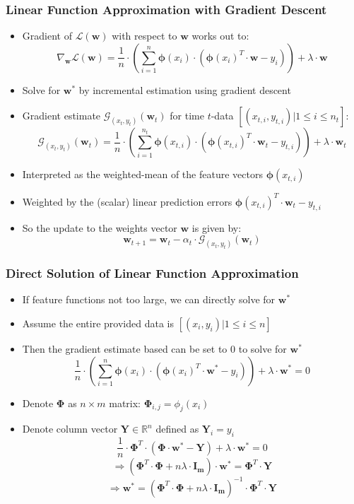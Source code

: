 \documentclass[handout]{beamer}
\begin{document}
\begin{frame}
\frametitle{Linear Function Approximation with Gradient Descent}
\pause
\begin{itemize}[<+->]
\item Gradient of $\mathcal{L}(\bm{w})$ with respect to $\bm{w}$ works out to:
$$\nabla_{\bm{w}} \mathcal{L}(\bm{w}) = \frac 1 n \cdot (\sum_{i=1}^n \bm{\phi}(x_i) \cdot (\bm{\phi}(x_i)^T \cdot \bm{w} - y_i)) + \lambda \cdot \bm{w}$$
\item Solve for $\bm{w^*}$ by incremental estimation using gradient descent
\item Gradient estimate $\mathcal{G}_{(x_t,y_t)}(\bm{w}_t)$ for time $t$-data $[(x_{t,i}, y_{t,i})|1 \leq i \leq n_t]$:
$$\mathcal{G}_{(x_t, y_t)}(\bm{w}_t) = \frac 1 n \cdot (\sum_{i=1}^{n_t} \bm{\phi}(x_{t,i}) \cdot (\bm{\phi}(x_{t,i})^T \cdot \bm{w}_t - y_{t,i})) + \lambda \cdot \bm{w}_t$$
\item Interpreted as the weighted-mean of the feature vectors $\bm{\phi}(x_{t,i})$
\item Weighted by the (scalar) linear prediction errors $\bm{\phi}(x_{t,i})^T \cdot \bm{w}_t - y_{t,i}$
\item So the update to the weights vector $\bm{w}$ is given by:
$$\bm{w}_{t+1} = \bm{w}_t - \alpha_t \cdot \mathcal{G}_{(x_t, y_t)}(\bm{w}_t)$$
\end{itemize}
\end{frame}

\begin{frame}
\frametitle{Direct Solution of Linear Function Approximation}
\pause
\begin{itemize}[<+->]
\item If feature functions not too large, we can directly solve for $\bm{w^*}$ 
\item Assume the entire provided data is $[(x_i, y_i)|1\leq i \leq n]$
\item Then the gradient estimate based can be set to 0 to solve for $\bm{w^*}$
$$\frac 1 n \cdot (\sum_{i=1}^n \bm{\phi}(x_i) \cdot (\bm{\phi}(x_i)^T \cdot \bm{w^*} - y_i)) + \lambda \cdot \bm{w^*} = 0$$
\item Denote $\bm{\Phi}$ as $n \times m$ matrix: $\bm{\Phi}_{i,j} = \phi_j(x_i)$
\item Denote column vector $\bm{Y} \in \mathbb{R}^n$ defined as $\bm{Y}_i = y_i$
$$\frac 1 n \cdot \bm{\Phi}^T \cdot (\bm{\Phi} \cdot \bm{w^*} - \bm{Y}) + \lambda \cdot \bm{w^*} = 0$$
$$\Rightarrow (\bm{\Phi}^T \cdot \bm{\Phi} + n \lambda \cdot \bm{I_m}) \cdot \bm{w^*} = \bm{\Phi}^T \cdot \bm{Y}$$
$$\Rightarrow \bm{w^*} = (\bm{\Phi}^T \cdot \bm{\Phi} + n \lambda \cdot \bm{I_m})^{-1} \cdot \bm{\Phi}^T \cdot \bm{Y}$$
\end{itemize}
\end{frame}
\end{document}
